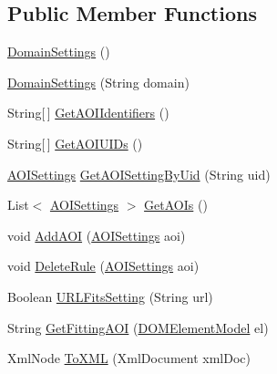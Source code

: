 \subsection*{Public Member Functions}
\begin{DoxyCompactItemize}
\item 
\hyperlink{class_web_analyzer_1_1_models_1_1_settings_model_1_1_domain_settings_a8ffad3f7b78462d687db4f95dd484953}{Domain\+Settings} ()
\item 
\hyperlink{class_web_analyzer_1_1_models_1_1_settings_model_1_1_domain_settings_af6797984cc6e12c59f276558864db719}{Domain\+Settings} (String domain)
\item 
String\mbox{[}$\,$\mbox{]} \hyperlink{class_web_analyzer_1_1_models_1_1_settings_model_1_1_domain_settings_a7ff89407de4e9ea34dc9535194dc3ca5}{Get\+A\+O\+I\+Identifiers} ()
\item 
String\mbox{[}$\,$\mbox{]} \hyperlink{class_web_analyzer_1_1_models_1_1_settings_model_1_1_domain_settings_a29e5b2dc3e3a0476dc5822615a949e21}{Get\+A\+O\+I\+U\+I\+Ds} ()
\item 
\hyperlink{class_web_analyzer_1_1_models_1_1_settings_model_1_1_a_o_i_settings}{A\+O\+I\+Settings} \hyperlink{class_web_analyzer_1_1_models_1_1_settings_model_1_1_domain_settings_a5cd076f8ac19ba306443c66ea0a032a7}{Get\+A\+O\+I\+Setting\+By\+Uid} (String uid)
\item 
List$<$ \hyperlink{class_web_analyzer_1_1_models_1_1_settings_model_1_1_a_o_i_settings}{A\+O\+I\+Settings} $>$ \hyperlink{class_web_analyzer_1_1_models_1_1_settings_model_1_1_domain_settings_ab1d25299b3a24bad81acc44b1994f342}{Get\+A\+O\+Is} ()
\item 
void \hyperlink{class_web_analyzer_1_1_models_1_1_settings_model_1_1_domain_settings_a339c77553bc0005a04e1f054f78d4e16}{Add\+A\+O\+I} (\hyperlink{class_web_analyzer_1_1_models_1_1_settings_model_1_1_a_o_i_settings}{A\+O\+I\+Settings} aoi)
\item 
void \hyperlink{class_web_analyzer_1_1_models_1_1_settings_model_1_1_domain_settings_ab2f91f58d7deeaabda24138cb92999e9}{Delete\+Rule} (\hyperlink{class_web_analyzer_1_1_models_1_1_settings_model_1_1_a_o_i_settings}{A\+O\+I\+Settings} aoi)
\item 
Boolean \hyperlink{class_web_analyzer_1_1_models_1_1_settings_model_1_1_domain_settings_a19cfec6016d0dbfe5a3b5a73efca93df}{U\+R\+L\+Fits\+Setting} (String url)
\item 
String \hyperlink{class_web_analyzer_1_1_models_1_1_settings_model_1_1_domain_settings_a0ca77de384f02fee8e6a0ba8934ef2a6}{Get\+Fitting\+A\+O\+I} (\hyperlink{class_web_analyzer_1_1_models_1_1_data_model_1_1_d_o_m_element_model}{D\+O\+M\+Element\+Model} el)
\item 
Xml\+Node \hyperlink{class_web_analyzer_1_1_models_1_1_settings_model_1_1_domain_settings_a493458b4a083d0aca8d573612c578e7f}{To\+X\+M\+L} (Xml\+Document xml\+Doc)
\end{DoxyCompactItemize}
